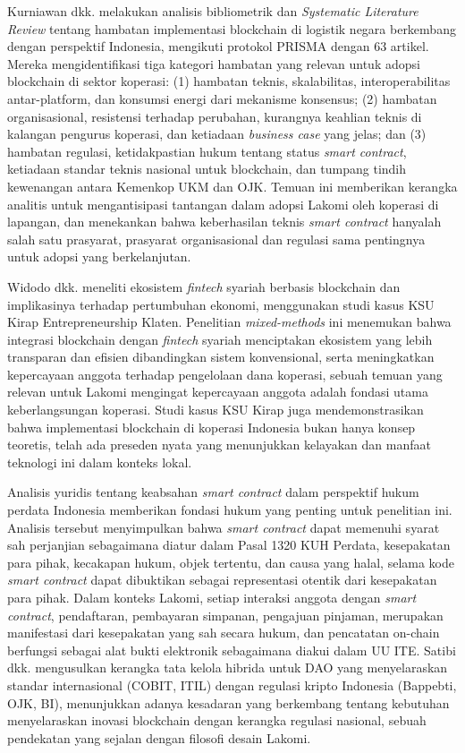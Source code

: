 Kurniawan dkk. \cite{kurniawan2026analisis} melakukan analisis bibliometrik dan \textit{Systematic Literature Review} tentang hambatan implementasi blockchain di logistik negara berkembang dengan perspektif Indonesia, mengikuti protokol PRISMA dengan 63 artikel. Mereka mengidentifikasi tiga kategori hambatan yang relevan untuk adopsi blockchain di sektor koperasi: (1) hambatan teknis, skalabilitas, interoperabilitas antar-platform, dan konsumsi energi dari mekanisme konsensus; (2) hambatan organisasional, resistensi terhadap perubahan, kurangnya keahlian teknis di kalangan pengurus koperasi, dan ketiadaan \textit{business case} yang jelas; dan (3) hambatan regulasi, ketidakpastian hukum tentang status \textit{smart contract}, ketiadaan standar teknis nasional untuk blockchain, dan tumpang tindih kewenangan antara Kemenkop UKM dan OJK. Temuan ini memberikan kerangka analitis untuk mengantisipasi tantangan dalam adopsi Lakomi oleh koperasi di lapangan, dan menekankan bahwa keberhasilan teknis \textit{smart contract} hanyalah salah satu prasyarat, prasyarat organisasional dan regulasi sama pentingnya untuk adopsi yang berkelanjutan.

Widodo dkk. \cite{widodo2024pengembangan} meneliti ekosistem \textit{fintech} syariah berbasis blockchain dan implikasinya terhadap pertumbuhan ekonomi, menggunakan studi kasus KSU Kirap Entrepreneurship Klaten. Penelitian \textit{mixed-methods} ini menemukan bahwa integrasi blockchain dengan \textit{fintech} syariah menciptakan ekosistem yang lebih transparan dan efisien dibandingkan sistem konvensional, serta meningkatkan kepercayaan anggota terhadap pengelolaan dana koperasi, sebuah temuan yang relevan untuk Lakomi mengingat kepercayaan anggota adalah fondasi utama keberlangsungan koperasi. Studi kasus KSU Kirap juga mendemonstrasikan bahwa implementasi blockchain di koperasi Indonesia bukan hanya konsep teoretis, telah ada preseden nyata yang menunjukkan kelayakan dan manfaat teknologi ini dalam konteks lokal.

Analisis yuridis tentang keabsahan \textit{smart contract} dalam perspektif hukum perdata Indonesia \cite{smartcontract2021analisis} memberikan fondasi hukum yang penting untuk penelitian ini. Analisis tersebut menyimpulkan bahwa \textit{smart contract} dapat memenuhi syarat sah perjanjian sebagaimana diatur dalam Pasal 1320 KUH Perdata, kesepakatan para pihak, kecakapan hukum, objek tertentu, dan causa yang halal, selama kode \textit{smart contract} dapat dibuktikan sebagai representasi otentik dari kesepakatan para pihak. Dalam konteks Lakomi, setiap interaksi anggota dengan \textit{smart contract}, pendaftaran, pembayaran simpanan, pengajuan pinjaman, merupakan manifestasi dari kesepakatan yang sah secara hukum, dan pencatatan on-chain berfungsi sebagai alat bukti elektronik sebagaimana diakui dalam UU ITE. Satibi dkk. \cite{satibi2025governance} mengusulkan kerangka tata kelola hibrida untuk DAO yang menyelaraskan standar internasional (COBIT, ITIL) dengan regulasi kripto Indonesia (Bappebti, OJK, BI), menunjukkan adanya kesadaran yang berkembang tentang kebutuhan menyelaraskan inovasi blockchain dengan kerangka regulasi nasional, sebuah pendekatan yang sejalan dengan filosofi desain Lakomi.

